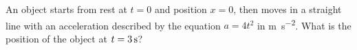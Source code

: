 \documentclass{../../oss-apphys-exam}
\begin{document}
\begin{multicols*}{2}
\begin{questions}
%  
%    

    \question An object starts from rest at $t=0$ and position $x=0$, then moves
    in a straight line with an acceleration described by the equation $a=4t^2$
    in \si{\metre\per\second\squared}. What is the position of the object at
    $t=\SI3\second$?
    \columnbreak
    

\end{questions}
\end{multicols*}
\end{document}
